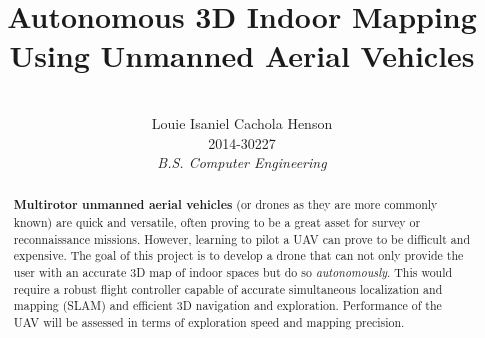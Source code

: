 \documentclass[english]{upeeei}
\begin{document}
\title{Autonomous 3D Indoor Mapping Using Unmanned Aerial Vehicles} 


\author{
\\Louie Isaniel Cachola Henson \\ 2014-30227 \\ \emph{B.S. Computer Engineering}
}




\maketitle
\begin{abstract} 

\textbf{Multirotor unmanned aerial vehicles} (or drones as they are more commonly known) are quick and versatile, often 
proving to be a great asset for survey or reconnaissance missions. However, learning to pilot a UAV can prove to be 
difficult and expensive. The goal of this project is to develop a drone that can not only provide the user with an
accurate 3D map of indoor spaces but do so \emph{autonomously}. This would require a robust flight controller capable of
accurate simultaneous localization and mapping (SLAM) and efficient 3D navigation and exploration. Performance of the UAV
will be assessed in terms of exploration speed and mapping precision.

\end{abstract}

\begin{frontmatter}
\setlength{\parskip}{0pt}
\tableofcontents
\listoftables
\listoffigures
\end{frontmatter}
\def\MASTERDOC{true}
\end{document}

